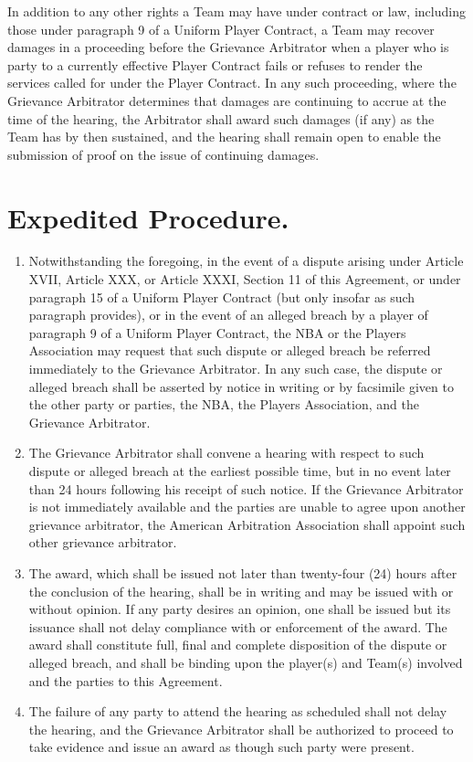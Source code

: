 \documentclass[
]{book}
\providecommand{\tightlist}{%
  \setlength{\itemsep}{0pt}\setlength{\parskip}{0pt}}
\begin{document}
In addition to any other rights a Team may have under contract or law, including those under paragraph 9 of a Uniform Player Contract, a Team may recover damages in a proceeding before the Grievance Arbitrator when a player who is party to a currently effective Player Contract fails or refuses to render the services called for under the Player Contract. In any such proceeding, where the Grievance Arbitrator determines that damages are continuing to accrue at the time of the hearing, the Arbitrator shall award such damages (if any) as the Team has by then sustained, and the hearing shall remain open to enable the submission of proof on the issue of continuing damages.

\hypertarget{expedited-procedure.}{%
\section{Expedited Procedure.}\label{expedited-procedure.}}

\begin{enumerate}
\def\labelenumi{(\alph{enumi})}
\tightlist
\item
  Notwithstanding the foregoing, in the event of a dispute arising under Article XVII, Article XXX, or Article XXXI, Section 11 of this Agreement, or under paragraph 15 of a Uniform Player Contract (but only insofar as such paragraph provides), or in the event of an alleged breach by a player of paragraph 9 of a Uniform Player Contract, the NBA or the Players Association may request that such dispute or alleged breach be referred immediately to the Grievance Arbitrator. In any such case, the dispute or alleged breach shall be asserted by notice in writing or by facsimile given to the other party or parties, the NBA, the Players Association, and the Grievance Arbitrator.
\item
  The Grievance Arbitrator shall convene a hearing with respect to such dispute or alleged breach at the earliest possible time, but in no event later than 24 hours following his receipt of such notice. If the Grievance Arbitrator is not immediately available and the parties are unable to agree upon another grievance arbitrator, the American Arbitration Association shall appoint such other grievance arbitrator.
\item
  The award, which shall be issued not later than twenty-four (24) hours after the conclusion of the hearing, shall be in writing and may be issued with or without opinion. If any party desires an opinion, one shall be issued but its issuance shall not delay compliance with or enforcement of the award. The award shall constitute full, final and complete disposition of the dispute or alleged breach, and shall be binding upon the player(s) and Team(s) involved and the parties to this Agreement.
\item
  The failure of any party to attend the hearing as scheduled shall not delay the hearing, and the Grievance Arbitrator shall be authorized to proceed to take evidence and issue an award as though such party were present.
\end{enumerate}
\end{document}

